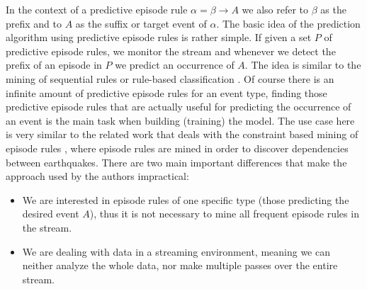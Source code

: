 In the context of a predictive episode rule $\alpha = \beta \rightarrow A$ we also refer to $\beta$ as the prefix and to $A$ as the suffix or target event of $\alpha$. 
The basic idea of the prediction algorithm using predictive episode rules is rather simple. If given a set $P$ of predictive episode rules, we monitor the stream and whenever we detect the prefix of an episode in $P$ we predict an occurrence of $A$. The idea is similar to the mining of sequential rules or rule-based classification \cite{ma1998integrating}.
Of course there is an infinite amount of predictive episode rules for an event type, finding those predictive episode rules that are actually useful for predicting the occurrence of an event is the main task when building (training) the model. The use case here is very similar to the related work that deals with the constraint based mining of episode rules \cite{meger2004constraint}, where episode rules are mined in order to discover dependencies between earthquakes. There are two main important differences that make the approach used by the authors impractical:

\begin{itemize}
 \item We are interested in episode rules of one specific type (those predicting the desired event $A$), thus it is not necessary to mine all frequent episode rules in the stream.
 \item We are dealing with data in a streaming environment, meaning we can neither analyze the whole data, nor make multiple passes over the entire stream.
\end{itemize}

